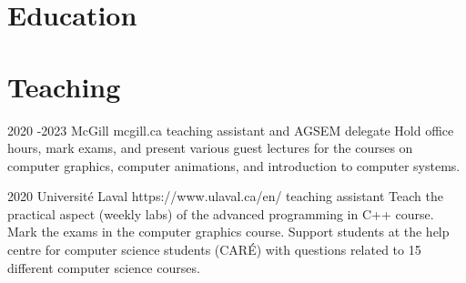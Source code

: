 \documentclass[10pt]{article} %
\begin{document}

\section{Education}







\section{Teaching}
\job
{2020  -}{2023}
{McGill}
{mcgill.ca}
{teaching assistant and AGSEM delegate}
{Hold office hours, mark exams, and present various guest lectures for the courses on computer graphics, computer animations, and introduction to computer systems.}

\job
{}{2020}
{Université Laval}
{https://www.ulaval.ca/en/}
{teaching assistant}
{Teach the practical aspect (weekly labs) of the advanced programming in C++ course. Mark the exams in the computer graphics course. Support students at the help centre for computer science students (CARÉ) with questions related to 15 different computer science courses.}
\end{document}

